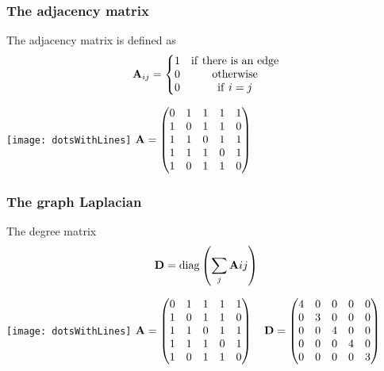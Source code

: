 \documentclass[12pt,fleqn]{beamer}
\begin{document}
\begin{frame}
\frametitle{The adjacency matrix }

The adjacency matrix is defined as
\begin{eqnarray*}
{\bf A}_{ij} = 	\left\{  \begin{matrix} 1 & {\rm if \ there\ is\ an \ edge} \\
						0 & {\rm otherwise}  \\
						0  & {\rm if }\ i=j \end{matrix} \right. 
\end{eqnarray*}

\texttt{[image: dotsWithLines]}
$ {\bf A} = \begin{pmatrix} 0 & 1 & 1 & 1 & 1 \\
                                        1 & 0 & 1 & 1 & 0 \\
                                        1 & 1 & 0 & 1 & 1 \\
                                        1 & 1 & 1 & 0 & 1 \\
                                        1 & 0 & 1 & 1 & 0 \end{pmatrix} $



\end{frame}

\begin{frame}
\frametitle{The graph Laplacian }

The degree matrix
$$ {{\bf D}}   = {\rm diag}\left( \sum_j {\bf A}{ij} \right) $$ 

\texttt{[image: dotsWithLines]}
$ {\bf A} = \begin{pmatrix} 0 & 1 & 1 & 1 & 1 \\
                                        1 & 0 & 1 & 1 & 0 \\
                                        1 & 1 & 0 & 1 & 1 \\
                                        1 & 1 & 1 & 0 & 1 \\
                                        1 & 0 & 1 & 1 & 0 \end{pmatrix}  \quad
   {\bf D} = \begin{pmatrix} 4 & 0 & 0 & 0 & 0 \\
                                        0 & 3 & 0 & 0 & 0 \\
                                        0 & 0 & 4 & 0 & 0 \\
                                        0 & 0 & 0 & 4 & 0 \\
                                        0 & 0 & 0 & 0 & 3 \end{pmatrix} 
                                        $


\end{frame}
\end{document}
